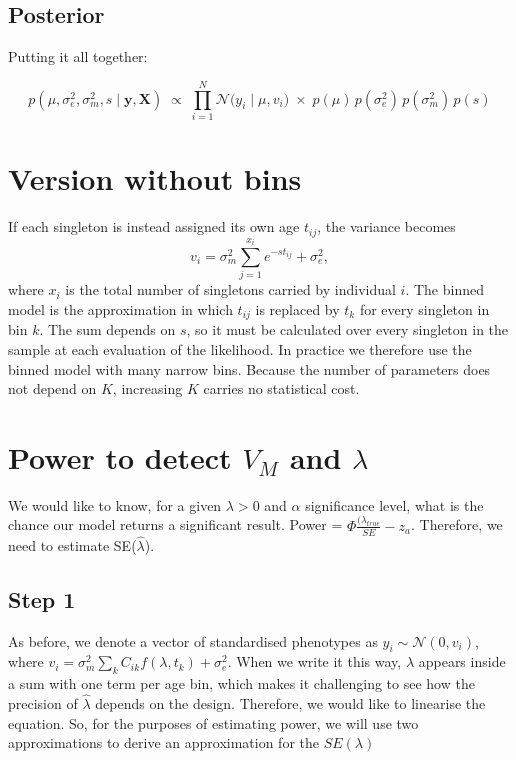 \documentclass{article}
\begin{document}
\subsection{Posterior}

Putting it all together:

\begin{equation}
    p(\mu, \sigma^2_e, \sigma^2_m, s \mid \mathbf{y}, \mathbf{X}) \;\propto\; \prod_{i=1}^{N} \mathcal{N}\!\big(y_i \mid \mu, v_i\big) \;\times\; p(\mu)\,p(\sigma^2_e)\,p(\sigma^2_m)\,p(s)
\end{equation}

\section{Version without bins}

If each singleton is instead assigned its own age $t_{ij}$, the variance becomes
\begin{equation}
    v_i = \sigma_m^2 \sum_{j=1}^{x_i} e^{-s t_{ij}} + \sigma_e^2 ,
\end{equation}
where $x_i$ is the total number of singletons carried by individual $i$. The binned model is the approximation in which $t_{ij}$ is replaced by $t_k$ for every singleton in bin $k$. The sum depends on $s$, so it must be calculated over every singleton in the sample at each evaluation of the likelihood. In practice we therefore use the binned model with many narrow bins. Because the number of parameters does not depend on $K$, increasing $K$ carries no statistical cost.

\section{Power to detect $V_M$ and $\lambda$}

We would like to know, for a given $\lambda > 0$ and $\alpha$ significance level, what is the chance our model returns a significant result. Power = $\Phi\frac{(\lambda_{true}}{SE} - z_{a}$. Therefore, we need to estimate SE($\hat{\lambda}$).

\subsection{Step 1}

As before, we denote a vector of standardised phenotypes as $y_{i} \sim \mathcal{N}(0, v_{i})$, where $v_{i} = \sigma^2_m \sum_{k} C_{ik} f(\lambda, t_{k}) + \sigma^2_e$. When we write it this way, $\lambda$ appears inside a sum with one term per age bin, which makes it challenging to see how the precision of $\hat{\lambda}$ depends on the design. Therefore, we would like to linearise the equation. So, for the purposes of estimating power, we will use two approximations to derive an approximation for the $SE(\lambda)$
\end{document}
